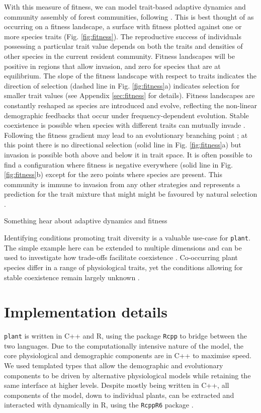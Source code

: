 \documentclass[a4paper,11pt]{article}
\newcommand{\plant}{\texttt{plant}}
\begin{document}
With this measure of fitness, we can model trait-based adaptive
dynamics and community assembly of forest communities, following
 \citep{Falster-2015}. This is best
thought of as occurring on a fitness landscape, a surface with fitness
plotted against one or more species traits
(Fig. \ref{fig:fitness}). The reproductive success of individuals
possessing a particular trait value depends on both the traits and
densities of other species in the current resident community. Fitness
landscapes will be positive in regions that allow invasion, and zero
for species that are at equilibrium. The slope of the fitness
landscape with respect to traits indicates the direction of selection
(dashed line in Fig. \ref{fig:fitness}a) indicates selection for
smaller trait values (see Appendix \ref{sec:fitness} for
details). Fitness landscapes are constantly reshaped as species are
introduced and evolve, reflecting the non-linear demographic feedbacks
that occur under frequency-dependent evolution. Stable coexistence is
possible when species with different traits can mutually invade
\citep{Geritz-1998, Chesson-2000}. Following the fitness gradient may lead to an
evolutionary branching point \citep{Geritz-1998}; at
this point there is no directional selection (solid line in
Fig. \ref{fig:fitness}a) but invasion is possible both above and below
it in trait space. It is often possible to find a configuration where
fitness is negative everywhere (solid line in Fig. \ref{fig:fitness}b)
except for the zero points where species are present. This community
is immune to invasion from any other strategies and represents a
prediction for the trait mixture that might might be favoured by
natural selection \citep{Geritz-1998}.

Something hear about adaptive dynamics and fitness

Identifying conditions promoting trait diversity is a valuable use-case
for {\plant}. The simple example here can be extended to multiple dimensions
and can be used to investigate how trade-offs facilitate coexistence
\citep{Falster-2015}. Co-occurring plant species differ in a range of physiological
traits, yet the conditions allowing for stable coexistence remain largely
unknown \citep{Adler-2013}.

\section{Implementation details}

{\plant} is written in C++ and R, using the package \texttt{Rcpp}
\citep{Eddelbuettel-2011, Eddelbuettel-2013} to bridge between the two
languages. Due to the computationally intensive nature of the model,
the core physiological and demographic components are in C++ to
maximise speed. We used templated types that allow the demographic and
evolutionary components to be driven by alternative physiological
models while retaining the same interface at higher levels. Despite
mostly being written in C++, all components of the model, down to
individual plants, can be extracted and interacted with dynamically in
R, using the \texttt{RcppR6} package \citep{RcppR6}.
\end{document}
